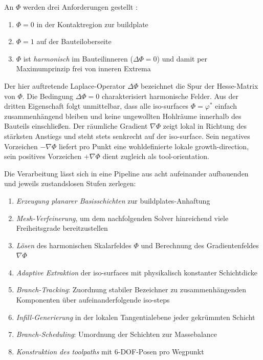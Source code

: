                 An $\Phi$ werden drei Anforderungen gestellt :
                \begin{enumerate}
                    \item $\Phi = 0$ in der Kontaktregion zur \gls{buildplate}
                    \item $\Phi = 1$ auf der Bauteiloberseite
                    \item $\Phi$ ist \emph{harmonisch} im Bauteilinneren ($\Delta\Phi = 0$) und damit per Maximumprinzip frei von inneren Extrema
                \end{enumerate}
                Der hier auftretende Laplace-Operator $\Delta\Phi$ bezeichnet die Spur der Hesse-Matrix von $\Phi$.
                Die Bedingung $\Delta\Phi = 0$ charakterisiert harmonische Felder.
                Aus der dritten Eigenschaft folgt unmittelbar, dass alle \glspl{iso-surface} $\Phi = \varphi^*$ einfach zusammenhängend bleiben und keine ungewollten Hohlräume innerhalb des Bauteils einschließen.
                Der räumliche Gradient $\nabla\Phi$ zeigt lokal in Richtung des stärksten Anstiegs und steht stets senkrecht auf der \gls{iso-surface}.
                Sein negatives Vorzeichen $-\nabla\Phi$ liefert pro Punkt eine wohldefinierte lokale \gls{growth-direction}, sein positives Vorzeichen $+\nabla\Phi$ dient zugleich als \gls{tool-orientation}.

                Die Verarbeitung lässt sich in eine Pipeline aus acht aufeinander aufbauenden und jeweils zustandslosen Stufen zerlegen:

                \begin{enumerate}
                    \item \emph{Erzeugung planarer Basisschichten} zur \glspl{buildplate}-Anhaftung
                    \item \emph{Mesh-Verfeinerung}, um dem nachfolgenden Solver hinreichend viele Freiheitsgrade bereitzustellen
                    \item \emph{Lösen} des harmonischen Skalarfeldes $\Phi$ und Berechnung des Gradientenfeldes $\nabla\Phi$
                    \item \emph{Adaptive Extraktion} der \glspl{iso-surface} mit physikalisch konstanter Schichtdicke
                    \item \emph{Branch-Tracking}: Zuordnung stabiler Bezeichner zu zusammenhängenden Komponenten über aufeinanderfolgende \glspl{iso-step}
                    \item \emph{Infill-Generierung} in der lokalen Tangentialebene jeder gekrümmten Schicht
                    \item \emph{Branch-Scheduling}: Umordnung der Schichten zur Massebalance
                    \item \emph{Konstruktion des \glspl{toolpath}} mit 6-\ac{DOF}-Posen pro Wegpunkt
                \end{enumerate}

